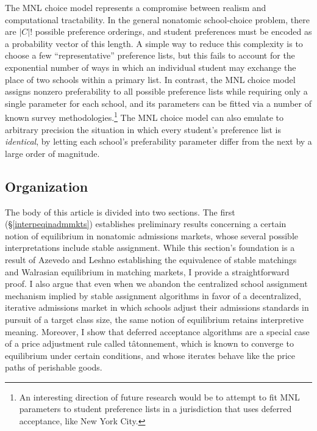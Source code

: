 \documentclass[12pt]{article}
\numberwithin{equation}{subsection}
\theoremstyle{definition}
\begin{document}
The MNL choice model represents a compromise between realism and computational tractability. In the general nonatomic school-choice problem, there are $|C|!$ possible preference orderings, and student preferences must be encoded as a probability vector of this length. A simple way to reduce this complexity is to choose a few ``representative'' preference lists, but this fails to account for the exponential number of ways in which an individual student may exchange the place of two schools within a primary list. In contrast, the MNL choice model assigns nonzero preferability to all possible preference lists while requiring only a single parameter for each school, and its parameters can be fitted via a number of known survey methodologies.\footnote{An interesting direction of future research would be to attempt to fit MNL parameters to student preference lists in a jurisdiction that uses deferred acceptance, like New York City.} The MNL choice model can also emulate to arbitrary precision the situation in which every student's preference list is \emph{identical}, by letting each school's preferability parameter differ from the next by a large order of magnitude. 

\subsection{Organization}
The body of this article is divided into two sections. The first (\S\ref{interpeqinadmmkts}) establishes preliminary results concerning a certain notion of equilibrium in nonatomic admissions markets, whose several possible interpretations include stable assignment. While this section's foundation is a result of Azevedo and Leshno \parencite*{supplydemandfw} establishing the equivalence of stable matchings and Walrasian equilibrium in matching markets, I provide a straightforward proof. I also argue that even when we abandon the centralized school assignment mechanism implied by stable assignment algorithms in favor of a decentralized, iterative admissions market in which schools adjust their admissions standards in pursuit of a target class size, the same notion of equilibrium retains interpretive meaning. Moreover, I show that deferred acceptance algorithms are a special case of a price adjustment rule called t\^{a}tonnement, which is known to converge to equilibrium under certain conditions, and whose iterates behave like the price paths of perishable goods. 
\end{document}
